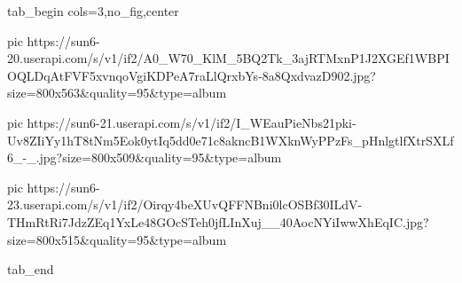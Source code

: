  
 
 
 
 

\ifcmt
  tab_begin cols=3,no_fig,center

     pic https://sun6-20.userapi.com/s/v1/if2/A0_W70_KlM_5BQ2Tk_3ajRTMxnP1J2XGEf1WBPIOQLDqAtFVF5xvnqoVgiKDPeA7raLlQrxbYs-8a8QxdvazD902.jpg?size=800x563&quality=95&type=album

     pic https://sun6-21.userapi.com/s/v1/if2/I_WEauPieNbs21pki-Uv8ZIiYy1hT8tNm5Eok0ytIq5dd0e71c8akncB1WXknWyPPzFs_pHnlgtlfXtrSXLf6_-_.jpg?size=800x509&quality=95&type=album

     pic https://sun6-23.userapi.com/s/v1/if2/Oirqy4beXUvQFFNBni0lcOSBf30ILdV-THmRtRi7JdzZEq1YxLe48GOcSTeh0jfLInXuj__40AocNYiIwwXhEqIC.jpg?size=800x515&quality=95&type=album

  tab_end
\fi
